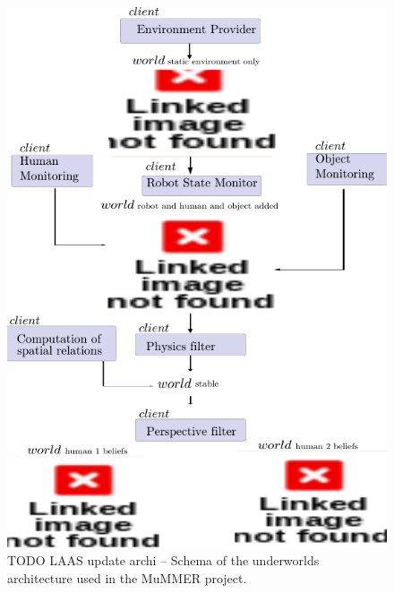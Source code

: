 \documentclass[letterpaper, 10pt, conference]{ieeeconf}
\newcommand{\uwds}{{\sc underworlds}\xspace}
\begin{document}
\begin{figure}
    \centering
    \includegraphics[width=0.9\linewidth]{laasudws}
    \caption{TODO LAAS update archi -- Schema of the \uwds architecture used in
    the MuMMER project. }
    \label{fig|mummerarchitecture}
\end{figure}
\end{document}
